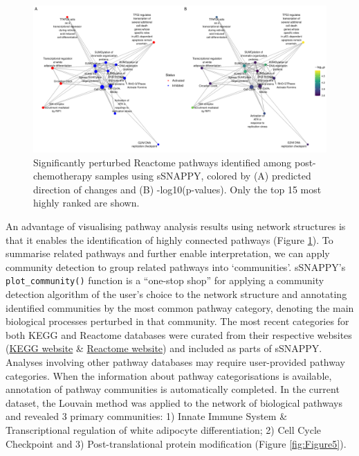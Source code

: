 \documentclass[9pt,a4paper,]{extarticle}
\begin{document}
\begin{figure}[hp]

{\centering \includegraphics[width=1\linewidth]{sSNAPPY_paper_files/figure-latex/Figure4-1} 

}

\caption{Significantly perturbed Reactome pathways identified among post-chemotherapy samples using sSNAPPY, colored by (A) predicted direction of changes and (B) -log10(p-values). Only the top 15 most highly ranked are shown.}\label{fig:Figure4}
\end{figure}

An advantage of visualising pathway analysis results using network structures is that it enables the identification of highly connected pathways (Figure \ref{fig:Figure4}).
To summarise related pathways and further enable interpretation, we can apply community detection\citep{Newman2004} to group related pathways into `communities'.
sSNAPPY's \texttt{plot\_community()} function is a ``one-stop shop'' for applying a community detection algorithm of the user's choice to the network structure and annotating identified communities by the most common pathway category, denoting the main biological processes perturbed in that community.
The most recent categories for both KEGG and Reactome databases were curated from their respective websites (\href{https://www.genome.jp/kegg/pathway.html}{KEGG website} \& \href{https://reactome.org/PathwayBrowser/\#/R-HSA-1632852&PATH=R-HSA-9612973}{Reactome website}) and included as parts of sSNAPPY.
Analyses involving other pathway databases may require user-provided pathway categories.
When the information about pathway categorisations is available, annotation of pathway communities is automatically completed.
In the current dataset, the Louvain method was applied to the network of biological pathways and revealed 3 primary communities: 1) Innate Immune System \& Transcriptional regulation of white adipocyte differentiation; 2) Cell Cycle Checkpoint and 3) Post-translational protein modification (Figure \ref{fig:Figure5}).
\end{document}
